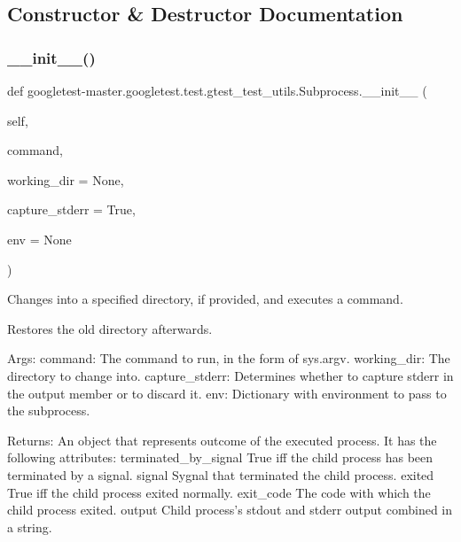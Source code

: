 \subsection{Constructor \& Destructor Documentation}
\mbox{\label{classgoogletest-master_1_1googletest_1_1test_1_1gtest__test__utils_1_1_subprocess_a25a470be4231964203fe17ab28d4ed0f}} 
\subsubsection{\texorpdfstring{\_\_init\_\_()}{\_\_init\_\_()}}
{\footnotesize\ttfamily def googletest-\/master.\+googletest.\+test.\+gtest\+\_\+test\+\_\+utils.\+Subprocess.\+\_\+\+\_\+init\+\_\+\+\_\+ (\begin{DoxyParamCaption}\item[{}]{self,  }\item[{}]{command,  }\item[{}]{working\+\_\+dir = {\ttfamily None},  }\item[{}]{capture\+\_\+stderr = {\ttfamily True},  }\item[{}]{env = {\ttfamily None} }\end{DoxyParamCaption})}

\begin{DoxyVerb}Changes into a specified directory, if provided, and executes a command.

Restores the old directory afterwards.

Args:
  command:        The command to run, in the form of sys.argv.
  working_dir:    The directory to change into.
  capture_stderr: Determines whether to capture stderr in the output member
              or to discard it.
  env:            Dictionary with environment to pass to the subprocess.

Returns:
  An object that represents outcome of the executed process. It has the
  following attributes:
terminated_by_signal   True iff the child process has been terminated
                       by a signal.
signal                 Sygnal that terminated the child process.
exited                 True iff the child process exited normally.
exit_code              The code with which the child process exited.
output                 Child process's stdout and stderr output
                       combined in a string.
\end{DoxyVerb}
 

